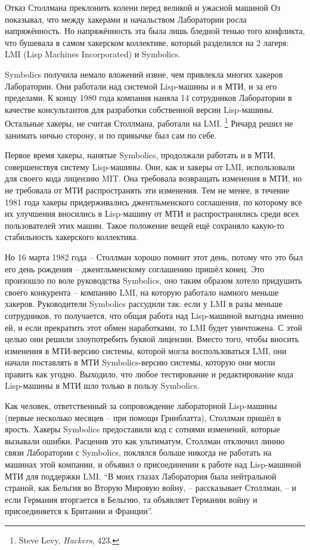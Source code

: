 Отказ Столлмана преклонить колени перед великой и ужасной машиной Оз показывал, что между хакерами и начальством Лаборатории росла напряжённость. Но напряжённость эта была лишь бледной тенью того конфликта, что бушевала в самом хакерском коллективе, который разделился на 2 лагеря: LMI (Lisp Machines Incorporated) и Symbolics.

Symbolics получила немало вложений извне, чем привлекла многих хакеров Лаборатории. Они работали над системой Lisp-машины и в МТИ, и за его пределами. К концу 1980 года компания наняла 14 сотрудников Лаборатории в качестве консультантов для разработки собственной версии Lisp-машины. Остальные хакеры, не считая Столлмана, работали на LMI. \footnote{Steve Levy, \textit{Hackers}, 423.} Ричард решил не занимать ничью сторону, и по привычке был сам по себе.

Первое время хакеры, нанятые Symbolics, продолжали работать и в МТИ, совершенствуя систему Lisp-машины. Они, как и хакеры от LMI, использовали для своего кода лицензию MIT. Она требовала возвращать изменения в МТИ, но не требовала от МТИ распространять эти изменения. Тем не менее, в течение 1981 года хакеры придерживались джентльменского соглашения, по которому все их улучшения вносились в Lisp-машину от МТИ и распространялись среди всех пользователей этих машин. Такое положение вещей ещё сохраняло какую-то стабильность хакерского коллектива.

Но 16 марта 1982 года -- Столлман хорошо помнит этот день, потому что это был его день рождения -- джентльменскому соглашению пришёл конец. Это произошло по воле руководства Symbolics, оно таким образом хотело придушить своего конкурента -- компанию LMI, на которую работало намного меньше хакеров. Руководители Symbolics рассудили так: если у LMI в разы меньше сотрудников, то получается, что общая работа над Lisp-машиной выгодна именно ей, и если прекратить этот обмен наработками, то LMI будет уничтожена. С этой целью они решили злоупотребить буквой лицензии. Вместо того, чтобы вносить изменения в МТИ-версию системы, которой могла воспользоваться LMI, они начали поставлять в МТИ Symbolics-версию системы, которую они могли править как угодно. Выходило, что любое тестирование и редактирование кода Lisp-машины в МТИ шло только в пользу Symbolics.

Как человек, ответственный за сопровождение лабораторной Lisp-машины (первые несколько месяцев -- при помощи Гринблатта), Столлман пришёл в ярость. Хакеры Symbolics предоставили код с сотнями изменений, которые вызывали ошибки. Расценив это как ультиматум, Столлман отключил линию связи Лаборатории с Symbolics, поклялся больше никогда не работать на машинах этой компании, и объявил о присоединении к работе над Lisp-машиной МТИ для поддержки LMI. \enquote{В моих глазах Лаборатория была нейтральной страной, как Бельгия во Вторую Мировую войну, -- рассказывает Столлман, -- и если Германия вторгается в Бельгию, та объявляет Германии войну и присоединяется к Британии и Франции}.

